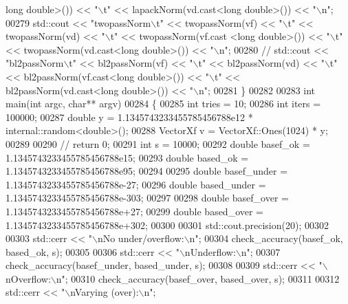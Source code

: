 \begin{DoxyCode}
{      long} \textcolor{keywordtype}{double}>()) << \textcolor{stringliteral}{"\(\backslash\)t"} << lapackNorm(vd.cast<\textcolor{keywordtype}{long} \textcolor{keywordtype}{double}>()) << \textcolor{stringliteral}{"\(\backslash\)n"};
00279   std::cout << \textcolor{stringliteral}{"twopassNorm\(\backslash\)t"} << twopassNorm(vf) << \textcolor{stringliteral}{"\(\backslash\)t"} << twopassNorm(vd) << \textcolor{stringliteral}{"\(\backslash\)t"} << twopassNorm(vf.cast
      <\textcolor{keywordtype}{long} \textcolor{keywordtype}{double}>()) << \textcolor{stringliteral}{"\(\backslash\)t"} << twopassNorm(vd.cast<\textcolor{keywordtype}{long} \textcolor{keywordtype}{double}>()) << \textcolor{stringliteral}{"\(\backslash\)n"};
00280 \textcolor{comment}{//   std::cout << "bl2passNorm\(\backslash\)t" << bl2passNorm(vf) << "\(\backslash\)t" << bl2passNorm(vd) << "\(\backslash\)t" <<
       bl2passNorm(vf.cast<long double>()) << "\(\backslash\)t" << bl2passNorm(vd.cast<long double>()) << "\(\backslash\)n";}
00281 \}
00282 
00283 \textcolor{keywordtype}{int} main(\textcolor{keywordtype}{int} argc, \textcolor{keywordtype}{char}** argv)
00284 \{
00285   \textcolor{keywordtype}{int} tries = 10;
00286   \textcolor{keywordtype}{int} iters = 100000;
00287   \textcolor{keywordtype}{double} y = 1.1345743233455785456788e12 * internal::random<double>();
00288   VectorXf v = VectorXf::Ones(1024) * y;
00289 
00290 \textcolor{comment}{// return 0;}
00291   \textcolor{keywordtype}{int} s = 10000;
00292   \textcolor{keywordtype}{double} basef\_ok = 1.1345743233455785456788e15;
00293   \textcolor{keywordtype}{double} based\_ok = 1.1345743233455785456788e95;
00294 
00295   \textcolor{keywordtype}{double} basef\_under = 1.1345743233455785456788e-27;
00296   \textcolor{keywordtype}{double} based\_under = 1.1345743233455785456788e-303;
00297 
00298   \textcolor{keywordtype}{double} basef\_over = 1.1345743233455785456788e+27;
00299   \textcolor{keywordtype}{double} based\_over = 1.1345743233455785456788e+302;
00300 
00301   std::cout.precision(20);
00302 
00303   std::cerr << \textcolor{stringliteral}{"\(\backslash\)nNo under/overflow:\(\backslash\)n"};
00304   check\_accuracy(basef\_ok, based\_ok, s);
00305 
00306   std::cerr << \textcolor{stringliteral}{"\(\backslash\)nUnderflow:\(\backslash\)n"};
00307   check\_accuracy(basef\_under, based\_under, s);
00308 
00309   std::cerr << \textcolor{stringliteral}{"\(\backslash\)nOverflow:\(\backslash\)n"};
00310   check\_accuracy(basef\_over, based\_over, s);
00311 
00312   std::cerr << \textcolor{stringliteral}{"\(\backslash\)nVarying (over):\(\backslash\)n"};

\end{DoxyCode}
